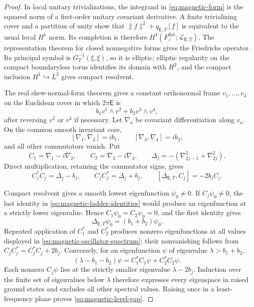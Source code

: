 \documentclass[11pt]{article}
\numberwithin{equation}{section}
\theoremstyle{definition}
\theoremstyle{remark}
\begin{document}
\begin{proof}
In local unitary trivializations, the integrand in
\eqref{eq:magnetic-form} is the squared norm of a first-order unitary
covariant derivative.  A finite trivializing cover and a partition of unity
show that $\|f\|^2+q_{\mathsf E,T}[f]$ is equivalent to the usual local
$H^1$ norm.  Its completion is therefore
$H^1(F_z^{\mathrm{flat}};\mathcal L_{\mathsf E,T})$.  The representation
theorem for closed nonnegative forms gives the Friedrichs operator.  Its
principal symbol is $G_T^{-1}(\xi,\xi)$, so it is elliptic; elliptic regularity
on the compact boundaryless torus identifies its domain with $H^2$, and the
compact inclusion $H^1\hookrightarrow L^2$ gives compact resolvent.

The real skew-normal-form theorem gives a constant orthonormal frame
$v_1,\ldots,v_4$ on the Euclidean cover in which $2\pi\mathsf E$ is
\[
 b_1v^1\wedge v^2+b_2v^3\wedge v^4,
\]
after reversing $v^2$ or $v^4$ if necessary.  Let $\nabla_a$ be covariant
differentiation along $v_a$.  On the common smooth invariant core,
\[
 [\nabla_1,\nabla_2]=ib_1,
 \qquad [\nabla_3,\nabla_4]=ib_2,
\]
and all other commutators vanish.  Put
\[
 C_1=\nabla_1-i\nabla_2,\qquad
 C_2=\nabla_3-i\nabla_4,\qquad
 \Delta_j=-(\nabla_{2j-1}^2+\nabla_{2j}^2).
\]
Direct multiplication, retaining the commutator signs, gives
\begin{equation}\label{eq:magnetic-ladder-identities}
 C_j^*C_j=\Delta_j-b_j,
 \qquad C_jC_j^*=\Delta_j+b_j,
 \qquad [\Delta_{\mathsf E,T},C_j]=-2b_jC_j.
\end{equation}

Compact resolvent gives a smooth lowest eigenfunction $\psi_0\ne0$.  If
$C_j\psi_0\ne0$, the last identity in
\eqref{eq:magnetic-ladder-identities} would produce an eigenfunction at a
strictly lower eigenvalue.  Hence $C_1\psi_0=C_2\psi_0=0$, and the first
identity gives
\[
 \Delta_{\mathsf E,T}\psi_0=(b_1+b_2)\psi_0.
\]
Repeated application of $C_1^*$ and $C_2^*$ produces nonzero eigenfunctions
at all values displayed in \eqref{eq:magnetic-oscillator-spectrum}; their
nonvanishing follows from $C_jC_j^*=C_j^*C_j+2b_j$.  Conversely, for an
eigenfunction $\psi$ of eigenvalue $\lambda>b_1+b_2$,
\[
 (\lambda-b_1-b_2)\psi
 =C_1^*C_1\psi+C_2^*C_2\psi.
\]
Each nonzero $C_j\psi$ lies at the strictly smaller eigenvalue
$\lambda-2b_j$.  Induction over the finite set of eigenvalues below
$\lambda$ therefore expresses every eigenspace in raised ground states and
excludes all other spectral values.  Raising once in a least-frequency plane
proves \eqref{eq:magnetic-level-gap}.
\end{proof}
\end{document}
